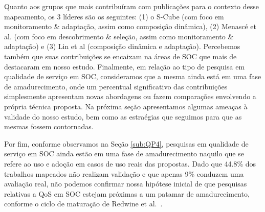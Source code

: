 Quanto aos grupos que mais contribu\'{i}ram com publica\c{c}\~{o}es para o contexto desse
mapeamento, os 3 l\'{i}deres s\~{a}o os seguintes: (1) o S-Cube (com foco em
monitoramento \& adapta\c{c}\~{a}o, assim como composi\c{c}\~{a}o
din\^{a}mica), (2) Menasc\'{e} et al. (com foco em descobrimento \&
sele\c{c}\~{a}o, assim como monitoramento \& adapta\c{c}\~{a}o) e (3)
Lin et al (composi\c{c}\~{a}o din\^{a}mica e
adapta\c{c}\~{a}o). Percebemos tamb\'{e}m que suas
contribui\c{c}\~{o}es se encaixam na \'{a}reas de SOC que mais de
destacaram em nosso estudo. 
Finalmente, em rela\c c\~{a}o ao tipo de pesquisa em
qualidade de servi\c{c}o em SOC, consideramos que a mesma ainda
est\'{a} em uma fase de amadurecimento, 
onde um percentual significativo das contribui\c{c}\~{o}es
simplesmente apresentam 
novas abordagens ou fazem compara\c{c}\~{o}es envolvendo a 
própria t\'{e}cnica proposta. Na pr\'{o}xima se\c c\~{a}o apresentamos
algumas amea\c cas \`{a} validade do nosso estudo, bem como as
estra\'{e}gias que seguimos para que as mesmas
fossem contornadas.

Por fim, conforme observamos na Seção \ref{sub:QP4}, pesquisas em qualidade de servi\c co em SOC ainda est\~{a}o em uma fase de amadurecimento naquilo que se refere ao uso e adoção em casos de uso reais das propostas. Dado que 44.8\% dos trabalhos mapeados n\~{a}o realizam validação e que apenas 9\% conduzem uma avaliação real, não podemos confirmar nossa hipótese inicial de que pesquisas 
relativas a QoS em SOC estejam próximas a um patamar de amadurecimento, conforme o ciclo de maturação de Redwine et al.~\cite{redwine:icse1985}.